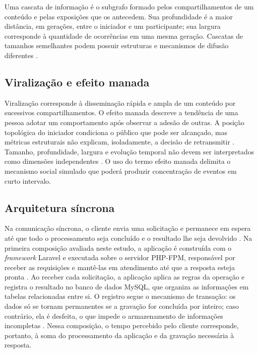 Uma cascata de informação é o subgrafo formado pelos compartilhamentos de um conteúdo e pelas exposições que os antecedem. Sua profundidade é a maior distância, em gerações, entre o iniciador e um participante; sua largura corresponde à quantidade de ocorrências em uma mesma geração. Cascatas de tamanhos semelhantes podem possuir estruturas e mecanismos de difusão diferentes \cite{sepehr2022,juul2021}.

\estrutura\subsection{\esp Viralização e efeito manada}

Viralização corresponde à disseminação rápida e ampla de um conteúdo por sucessivos compartilhamentos. O efeito manada descreve a tendência de uma pessoa adotar um comportamento após observar a adesão de outras. A posição topológica do iniciador condiciona o público que pode ser alcançado, mas métricas estruturais não explicam, isoladamente, a decisão de retransmitir \cite{liang2021}. Tamanho, profundidade, largura e evolução temporal não devem ser interpretados como dimensões independentes \cite{juul2021}. O uso do termo efeito manada delimita o mecanismo social simulado que poderá produzir concentração de eventos em curto intervalo.

\estrutura\subsection{\esp Arquitetura síncrona}

Na comunicação síncrona, o cliente envia uma solicitação e permanece em espera até que todo o processamento seja concluído e o resultado lhe seja devolvido \cite{aksakalli2021}. Na primeira composição avaliada neste estudo, a aplicação é construída com o \textit{framework} Laravel e executada sobre o servidor PHP-FPM, responsável por receber as requisições e mantê-las em atendimento até que a resposta esteja pronta \cite{phpfpm2026}. Ao receber cada solicitação, a aplicação aplica as regras da operação e registra o resultado no banco de dados MySQL, que organiza as informações em tabelas relacionadas entre si. O registro segue o mecanismo de transação: os dados só se tornam permanentes se a gravação for concluída por inteiro; caso contrário, ela é desfeita, o que impede o armazenamento de informações incompletas \cite{mysql2026}. Nessa composição, o tempo percebido pelo cliente corresponde, portanto, à soma do processamento da aplicação e da gravação necessária à resposta.

